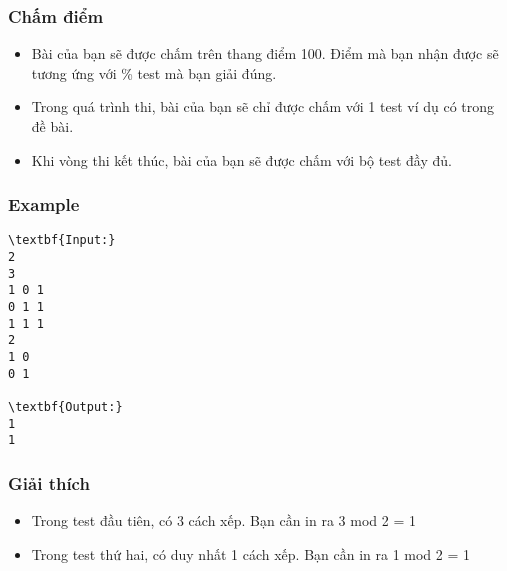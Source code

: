 \subsubsection{   Chấm điểm  }
\begin{itemize}
	\item     Bài của bạn sẽ được chấm trên thang điểm 100. Điểm mà bạn nhận được sẽ tương ứng với \% test mà bạn giải đúng.   
	\item     Trong quá trình thi, bài của bạn sẽ chỉ được chấm với 1 test ví dụ có trong đề bài.   
	\item     Khi vòng thi kết thúc, bài của bạn sẽ được chấm với bộ test đầy đủ.   
\end{itemize}
\begin{itemize}
\end{itemize}

\subsubsection{   Example  }
\begin{verbatim}
\textbf{Input:}
2
3
1 0 1
0 1 1
1 1 1
2
1 0
0 1

\textbf{Output:}
1
1
\end{verbatim}

\subsubsection{   Giải thích  }
\begin{itemize}
	\item     Trong test đầu tiên, có 3 cách xếp. Bạn cần in ra 3 mod 2 = 1   
	\item     Trong test thứ hai, có duy nhất 1 cách xếp. Bạn cần in ra 1 mod 2 = 1   
\end{itemize}